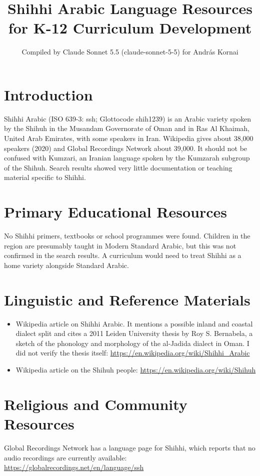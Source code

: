 \documentclass[12pt]{article}
\title{Shihhi Arabic Language Resources for K-12 Curriculum Development}
\author{Compiled by Claude Sonnet 5.5 (claude-sonnet-5-5) for Andr\'as Kornai}
\date{}
\begin{document}
\maketitle

\section{Introduction}
Shihhi Arabic (ISO 639-3: ssh; Glottocode shih1239) is an Arabic variety spoken by the Shihuh in the Musandam Governorate of Oman and in Ras Al Khaimah, United Arab Emirates, with some speakers in Iran. Wikipedia gives about 38,000 speakers (2020) and Global Recordings Network about 39,000. It should not be confused with Kumzari, an Iranian language spoken by the Kumzarah subgroup of the Shihuh. Search results showed very little documentation or teaching material specific to Shihhi.

\section{Primary Educational Resources}
No Shihhi primers, textbooks or school programmes were found. Children in the region are presumably taught in Modern Standard Arabic, but this was not confirmed in the search results. A curriculum would need to treat Shihhi as a home variety alongside Standard Arabic.

\section{Linguistic and Reference Materials}
\begin{itemize}
\item Wikipedia article on Shihhi Arabic. It mentions a possible inland and coastal dialect split and cites a 2011 Leiden University thesis by Roy S. Bernabela, a sketch of the phonology and morphology of the al-Jadida dialect in Oman. I did not verify the thesis itself: \url{https://en.wikipedia.org/wiki/Shihhi_Arabic}
\item Wikipedia article on the Shihuh people: \url{https://en.wikipedia.org/wiki/Shihuh}
\end{itemize}

\section{Religious and Community Resources}
Global Recordings Network has a language page for Shihhi, which reports that no audio recordings are currently available: \url{https://globalrecordings.net/en/language/ssh}
\end{document}
